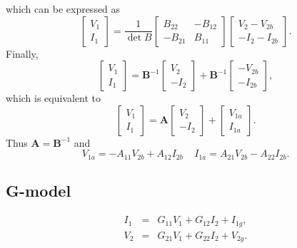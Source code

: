 \documentclass[a4paper, 12pt]{article}
\newcommand{\mat}[1]{\mathbf{#1}}
\newcommand{\bigspace}{\;\;\;\;}
\begin{document}
%
which can be expressed as
%
\begin{equation}
  \begin{bmatrix}
    V_1 \\ I_1
  \end{bmatrix}
  =
  \frac{1}{\det{B}}
  \begin{bmatrix}
    B_{22} & -B_{12} \\
    -B_{21} & B_{11}
  \end{bmatrix}
  \begin{bmatrix}
    V_2 - V_{2b} \\ -I_2 - I_{2b}
  \end{bmatrix}.
\end{equation}
%
Finally,
%
\begin{equation}
  \begin{bmatrix}
    V_1 \\ I_1
  \end{bmatrix}
  =
  \mat{B}^{-1}
  \begin{bmatrix}  
    V_2 \\ -I_2
  \end{bmatrix}
  +
  \mat{B}^{-1}
  \begin{bmatrix}  
    -V_{2b} \\ -I_{2b}
  \end{bmatrix},
\end{equation}
%
which is equivalent to
%
\begin{equation}
  \begin{bmatrix}
    V_1 \\ I_1
  \end{bmatrix}
  =
  \mat{A}
  \begin{bmatrix}  
    V_2 \\ -I_2
  \end{bmatrix}
  +
  \begin{bmatrix}  
    V_{1a} \\ I_{1a}
  \end{bmatrix}.
\end{equation}
%
Thus $\mat{A} = \mat{B}^{-1}$ and
%
\begin{equation}
V_{1a} = -A_{11} V_{2b} + A_{12} I_{2b} \bigspace I_{1a} = A_{21} V_{2b} - A_{22} I_{2b}.
\end{equation}


\subsection{G-model}

\begin{eqnarray}
\label{eqn:GI1}
  I_1 & = & G_{11} V_1 + G_{12} I_2 + I_{1g}, \\
  V_2 & = & G_{21} V_1 + G_{22} I_2 + V_{2g}.
\label{eqn:GV2}
\end{eqnarray}
\end{document}
